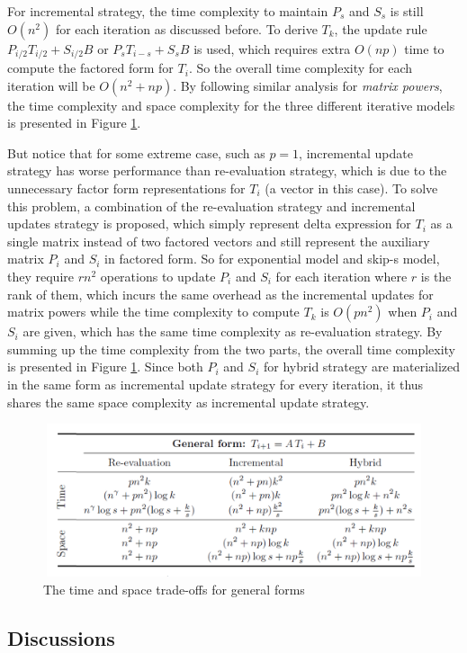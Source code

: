 For incremental strategy, the time complexity to maintain $P_s$ and $S_s$ is still $O(n^2)$ for each iteration as discussed before. To derive $T_k$, the update rule $P_{i/2}T_{i/2} + S_{i/2}B$ or $P_sT_{i-s} + S_sB$ is used, which requires extra $O(np)$ time to compute the factored form for $T_i$. So the overall time complexity for each iteration will be $O(n^2 + np)$. By following similar analysis for {\em matrix powers}, the time complexity and space complexity for the three different iterative models is presented in Figure \ref{fig:time_space_complexity_general_form}.

But notice that for some extreme case, such as $p=1$, incremental update strategy has worse performance than re-evaluation strategy, which is due to the unnecessary factor form representations for $T_i$ (a vector in this case). To solve this problem, a combination of the re-evaluation strategy and incremental updates strategy is proposed, which simply represent delta expression for $T_i$ as a single matrix instead of two factored vectors and still represent the auxiliary matrix $P_i$ and $S_i$ in factored form. So for exponential model and skip-s model, they require $rn^2$ operations to update $P_i$ and $S_i$ for each iteration where $r$ is the rank of them, which incurs the same overhead as the incremental updates for matrix powers while the time complexity to compute $T_k$ is $O(pn^2)$ when $P_i$ and $S_i$ are given, which has the same time complexity as re-evaluation strategy. By summing up the time complexity from the two parts, the overall time complexity is presented in Figure \ref{fig:time_space_complexity_general_form}. Since both $P_i$ and $S_i$ for hybrid strategy are materialized in the same form as incremental update strategy for every iteration, it thus shares the same space complexity as incremental update strategy.


\begin{figure}
    \centering
    \includegraphics[width=12cm, height=4.5cm]{Figures/time_space_complexity_general_form.png}
    \caption{The time and space trade-offs for general forms}
    \label{fig:time_space_complexity_general_form}
\end{figure}


\subsection{Discussions}
